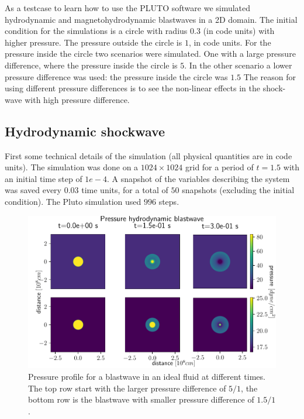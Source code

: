 As a testcase to learn how to use the PLUTO software we simulated hydrodynamic and magnetohydrodynamic blastwaves in a 2D domain. The initial condition for the simulations is a circle with radius $0.3$ (in code units) with higher pressure.
The pressure outside the circle is $1$, in code units. For the pressure inside the circle two scenarios were simulated.
One with a large pressure difference, where the pressure inside the circle is $5$. In the other scenario a lower pressure difference was used: the pressure inside the circle was $1.5$
The reason for using different pressure differences is to see the non-linear effects in the shock-wave with high pressure difference.

\subsection{Hydrodynamic shockwave}
First some technical details of the simulation (all physical quantities are in code units).
The simulation was done on a $1024 \times 1024$ grid for a period of $t=1.5$ with an initial time step of $1e-4$.
A snapshot of the variables describing the system was saved every $0.03$ time units, for a total of $50$ snapshots (excluding the initial condition).
The Pluto simulation used $996$ steps.

\begin{figure}[H]
	\centering
	\includegraphics[width=\linewidth]{images/HD-blast-prs-1.pdf}
	\caption{Pressure profile for a blastwave in an ideal fluid at different times. The top row start with the larger pressure difference of $5/1$, the bottom row is the blastwave with smaller pressure difference of $1.5/1$.}
	\label{fig:HD-blast-short}
\end{figure}

